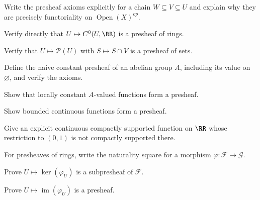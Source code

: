 \begin{exercise}
Write the presheaf axioms explicitly for a chain $W\subseteq V\subseteq U$ and explain why they are precisely functoriality on $\operatorname{Open}(X)^{op}$.
\end{exercise}

\begin{exercise}
Verify directly that $U\mapsto C^0(U,\RR)$ is a presheaf of rings.
\end{exercise}

\begin{exercise}
Verify that $U\mapsto\mathcal P(U)$ with $S\mapsto S\cap V$ is a presheaf of sets.
\end{exercise}

\begin{exercise}
Define the naive constant presheaf of an abelian group $A$, including its value on $\varnothing$, and verify the axioms.
\end{exercise}

\begin{exercise}
Show that locally constant $A$-valued functions form a presheaf.
\end{exercise}

\begin{exercise}
Show bounded continuous functions form a presheaf.
\end{exercise}

\begin{exercise}
Give an explicit continuous compactly supported function on $\RR$ whose restriction to $(0,1)$ is not compactly supported there.
\end{exercise}

\begin{exercise}[VI.12.E08 --- Morphisms]
For presheaves of rings, write the naturality square for a morphism $\varphi:\mathcal F\to\mathcal G$.
\end{exercise}

\begin{exercise}
Prove $U\mapsto\ker(\varphi_U)$ is a subpresheaf of $\mathcal F$.
\end{exercise}

\begin{exercise}
Prove $U\mapsto\operatorname{im}(\varphi_U)$ is a presheaf.
\end{exercise}

